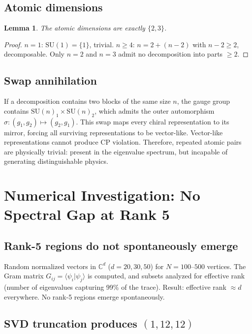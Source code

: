 \documentclass[12pt]{article}
\newtheorem{lemma}[theorem]{Lemma}
\theoremstyle{remark}
\begin{document}
{\subsection{Atomic dimensions}

\begin{lemma}
The atomic dimensions are exactly $\{2, 3\}$.
\end{lemma}

\begin{proof}
$n = 1$: $\text{SU}(1) = \{1\}$, trivial. $n \geq 4$: $n = 2 + (n-2)$ with $n-2 \geq 2$, decomposable. Only $n = 2$ and $n = 3$ admit no decomposition into parts $\geq 2$.
\end{proof}

\subsection{Swap annihilation}

If a decomposition contains two blocks of the same size $n$, the gauge group contains $\text{SU}(n)_1 \times \text{SU}(n)_2$, which admits the outer automorphism $\sigma: (g_1, g_2) \mapsto (g_2, g_1)$. This swap maps every chiral representation to its mirror, forcing all surviving representations to be vector-like. Vector-like representations cannot produce CP violation. Therefore, repeated atomic pairs are physically trivial: present in the eigenvalue spectrum, but incapable of generating distinguishable physics.

\section{Numerical Investigation: No Spectral Gap at Rank 5}

\subsection{Rank-5 regions do not spontaneously emerge}

Random normalized vectors in $\mathbb{C}^d$ ($d = 20, 30, 50$) for $N = 100$--$500$ vertices. The Gram matrix $G_{ij} = \langle\psi_i|\psi_j\rangle$ is computed, and subsets analyzed for effective rank (number of eigenvalues capturing 99\% of the trace). Result: effective rank $\approx d$ everywhere. No rank-5 regions emerge spontaneously.

\subsection{SVD truncation produces $(1, 12, 12)$}

}
\end{document}
